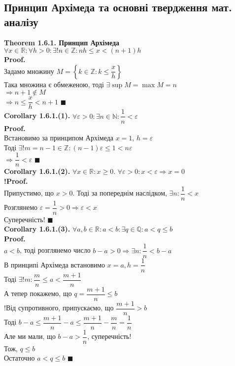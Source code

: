 \documentclass[a4paper, 14pt]{extarticle}
\def\bigline{\vspace{5mm}\\}
\def\th#1{\textbf{Theorem {#1}}}
\def\crl#1{\textbf{Corollary {#1}}}
\def\proof{\textbf{Proof.}\\}
\def\contra{\textbf{!Proof.}\\}
\def\bigline{\vspace{5mm}\\}
\def\qed{$\blacksquare$}
\begin{document}
	\subsection{Принцип Архімеда та основні твердження мат. аналізу}
	\th{1.6.1. Принцип Архімеда} \\ 
	$\forall x \in \mathbb{R}: \forall h > 0: \exists! n \in \mathbb{Z}: nh \leq x < (n+1)h$\\
\proof
Задамо множину $M = \left\{k \in \mathbb{Z}: k \leq \dfrac{x}{h} \right\}$\\
Така множина є обмеженою, тоді $\exists \sup M = \max M = n$\\
$\Rightarrow n+1 \not \in M$\\
$\Rightarrow n \leq \dfrac{x}{h} < n+1$ \qed
\bigline
\crl{1.6.1.(1).} $\forall \varepsilon > 0: \exists n \in \mathbb{N}: \dfrac{1}{n} < \varepsilon$\\
\proof
Встановимо за принципом Архімеда $x = 1$, $h = \varepsilon$\\
Тоді $\exists! m = n-1 \in \mathbb{Z}: (n-1)\varepsilon \leq 1 < n \varepsilon$\\
$\Rightarrow \dfrac{1}{n} < \varepsilon$ \qed
\bigline
\crl{1.6.1.(2).} $\forall x \in \mathbb{R}: x \geq 0$. $\forall \varepsilon > 0: x < \varepsilon \Rightarrow x = 0$\\
\contra
Припустимо, що $x > 0$. Тоді за попереднім наслідком, $\exists n: \dfrac{1}{n} < x$\\
Розглянемо $\varepsilon = \dfrac{1}{n} > 0 \Rightarrow \varepsilon < x$\\
Суперечність! \qed
\bigline
\crl{1.6.1.(3).} $\forall a,b \in \mathbb{R}: a < b: \exists q \in \mathbb{Q}: a < q \leq b$\\
\proof
$a < b$, тоді розглянемо число $b-a>0 \Rightarrow \exists n: \dfrac{1}{n} < b-a$\\
В принципі Архімеда встановимо $x = a, h = \dfrac{1}{n}$\\
Тоді $\exists! m: \dfrac{m}{n} \leq a < \dfrac{m+1}{n}$\\
А тепер покажемо, що $q = \dfrac{m+1}{n} \leq b$\\
!Від супротивного, припускаємо, що $\dfrac{m+1}{n} > b$\\
Тоді $b-a \leq \dfrac{m+1}{n} - a \leq \dfrac{m+1}{n} - \dfrac{m}{n} = \dfrac{1}{n}$\\
Але ми мали, що $b-a > \dfrac{1}{n}$, суперечність!\\
Тож, $q \leq b$\\
Остаточно $a < q \leq b$ \qed
\end{document}
